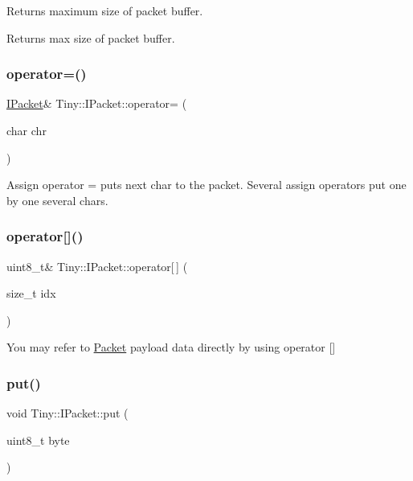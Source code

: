 Returns maximum size of packet buffer. \begin{DoxyReturn}{Returns}
max size of packet buffer. 
\end{DoxyReturn}
\mbox{\label{classTiny_1_1IPacket_a215a30775140c2977b7064c91eada17e}} 
\subsubsection{\texorpdfstring{operator=()}{operator=()}}
{\footnotesize\ttfamily \hyperlink{classTiny_1_1IPacket}{I\+Packet}\& Tiny\+::\+I\+Packet\+::operator= (\begin{DoxyParamCaption}\item[{char}]{chr }\end{DoxyParamCaption})\hspace{0.3cm}{\ttfamily [inline]}}

Assign operator = puts next char to the packet. Several assign operators put one by one several chars. \mbox{\label{classTiny_1_1IPacket_aa1d796806e21d1c72a1fc12d2f6db592}} 
\subsubsection{\texorpdfstring{operator[]()}{operator[]()}}
{\footnotesize\ttfamily uint8\+\_\+t\& Tiny\+::\+I\+Packet\+::operator\mbox{[}$\,$\mbox{]} (\begin{DoxyParamCaption}\item[{size\+\_\+t}]{idx }\end{DoxyParamCaption})\hspace{0.3cm}{\ttfamily [inline]}}

You may refer to \hyperlink{classTiny_1_1Packet}{Packet} payload data directly by using operator \mbox{[}\mbox{]} \mbox{\label{classTiny_1_1IPacket_a9d5ba62a453b9cd364c0e214c245f11d}} 
\subsubsection{\texorpdfstring{put()}{put()}\hspace{0.1cm}{\footnotesize\ttfamily [1/7]}}
{\footnotesize\ttfamily void Tiny\+::\+I\+Packet\+::put (\begin{DoxyParamCaption}\item[{uint8\+\_\+t}]{byte }\end{DoxyParamCaption})\hspace{0.3cm}{\ttfamily [inline]}}

